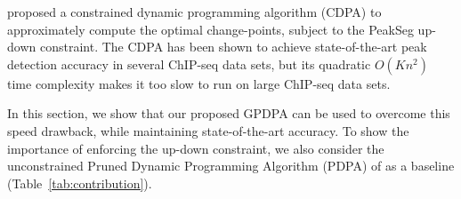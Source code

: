 \documentclass{article}
\begin{document}
\citet{HOCKING-PeakSeg} proposed a constrained dynamic programming
algorithm (CDPA) to approximately compute the optimal change-points,
subject to the PeakSeg up-down constraint. The CDPA has been shown to
achieve state-of-the-art peak detection accuracy in several ChIP-seq
data sets, but its quadratic $O(Kn^2)$ time complexity makes it too
slow to run on large ChIP-seq data sets.

In this section, we show that our proposed GPDPA
can be used to overcome this speed drawback, while maintaining
state-of-the-art accuracy. To show the importance of enforcing the
up-down constraint, we also consider the unconstrained Pruned Dynamic
Programming Algorithm (PDPA) of \citet{pruned-dp} as a baseline
(Table~\ref{tab:contribution}).

\end{document}
